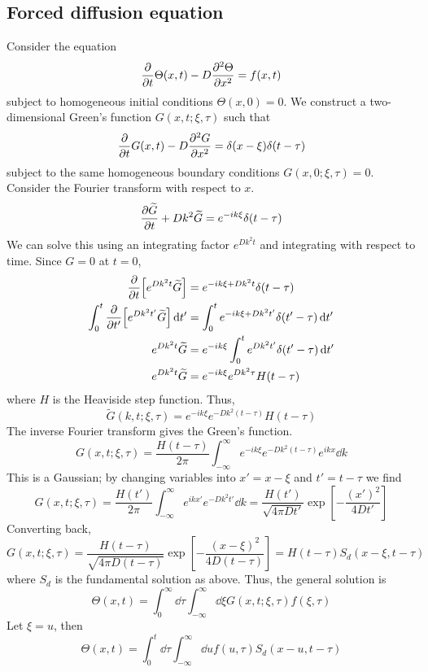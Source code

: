 \subsection{Forced diffusion equation}
Consider the equation
\[
	\pdv{t}\Theta(x,t) - D \pdv[2]{\Theta}{x}(x,t) = f(x,t)
\]
subject to homogeneous initial conditions \( \Theta(x,0) = 0 \).
We construct a two-dimensional Green's function \( G(x,t; \xi, \tau) \) such that
\[
	\pdv{t}G(x,t) - D \pdv[2]{G}{x}(x,t) = \delta(x - \xi)\delta(t - \tau)
\]
subject to the same homogeneous boundary conditions \( G(x,0;\xi,\tau) = 0 \).
Consider the Fourier transform with respect to \( x \).
\[
	\pdv{\widetilde G}{t} + D k^2 \widetilde G = e^{-ik\xi} \delta(t - \tau)
\]
We can solve this using an integrating factor \( e^{Dk^2 t} \) and integrating with respect to time.
Since \( G = 0 \) at \( t = 0 \),
\begin{align*}
	\pdv{t} \qty[ e^{D k^2 t} \widetilde G ]                    & = e^{-ik\xi + D k^2 t} \delta(t - \tau)                      \\
	\int_0^t \pdv{t'} \qty[ e^{D k^2 t'} \widetilde G ] \dd{t'} & = \int_0^t e^{-ik\xi + D k^2 t'} \delta(t' - \tau) \dd{t'}   \\
	e^{D k^2 t} \widetilde G                                    & = e^{-ik\xi} \int_0^t e^{D k^2 t'} \delta(t' - \tau) \dd{t'} \\
	e^{D k^2 t} \widetilde G                                    & = e^{-ik\xi} e^{D k^2 \tau} H(t - \tau)
\end{align*}
where \( H \) is the Heaviside step function.
Thus,
\[
	\widetilde G(k,t;\xi,\tau) = e^{-ik\xi} e^{-D k^2 (t - \tau)} H(t - \tau)
\]
The inverse Fourier transform gives the Green's function.
\[
	G(x,t;\xi,\tau) = \frac{H(t - \tau)}{2\pi} \int_{-\infty}^\infty e^{-ik\xi} e^{-D k^2 (t - \tau)} e^{ikx} \dd{k}
\]
This is a Gaussian; by changing variables into \( x' = x - \xi \) and \( t' = t - \tau \) we find
\[
	G(x,t;\xi,\tau) = \frac{H(t')}{2\pi} \int_{-\infty}^\infty e^{ikx'} e^{-D k^2 t'} \dd{k} = \frac{H(t')}{\sqrt{4 \pi D t'}} \exp[-\frac{(x')^2}{4Dt'}]
\]
Converting back,
\[
	G(x,t;\xi,\tau) = \frac{H(t - \tau)}{\sqrt{4 \pi D (t - \tau)}} \exp[-\frac{(x - \xi)^2}{4D(t - \tau)}] = H(t-\tau) S_d(x-\xi, t-\tau)
\]
where \( S_d \) is the fundamental solution as above.
Thus, the general solution is
\[
	\Theta(x,t) = \int_0^\infty \dd{\tau} \int_{-\infty}^\infty \dd{\xi} G(x,t;\xi,\tau) f(\xi, \tau)
\]
Let \( \xi = u \), then
\[
	\Theta(x,t) = \int_0^t \dd{\tau} \int_{-\infty}^\infty \dd{u} f(u, \tau) S_d(x-u, t-\tau)
\]

